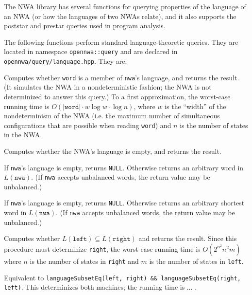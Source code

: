 The NWA library has several functions for querying
properties of the language of an NWA (or how the languages of two NWAs
relate), and it also supports
the poststar and prestar queries used in program analysis.

The following functions perform standard language-theoretic queries. They are
located in namespace \texttt{opennwa::query} and are declared in
\texttt{opennwa/query/language.hpp}. They are:
\begin{functionlist}
    Computes whether \texttt{word} is a member of
    \texttt{nwa}'s language, and returns the result. (It simulates the
    NWA in a nondeterministic fashion; the NWA is not determinized to answer
    this query.) To a first approximation, the worst-case running time is
    $O(|\texttt{word}|\cdot w\log w\cdot\log n)$, where $w$ is the ``width'' of
    the nondeterminism of the NWA (i.e. the maximum number of
    simultaneous configurations that are possible when reading \texttt{word})
    and $n$ is the number of states in the NWA.

    Computes
    whether the NWA's language is empty, and returns the result.

    If \texttt{nwa}'s language is empty, returns \texttt{NULL}. Otherwise
    returns an arbitrary word in $L(\texttt{nwa})$. (If \texttt{nwa} accepts
    unbalanced words, the return value may be unbalanced.)

    If \texttt{nwa}'s language is empty, returns \texttt{NULL}. Otherwise
    returns an arbitrary shortest word in $L(\texttt{nwa})$. (If \texttt{nwa} accepts
    unbalanced words, the return value may be unbalanced.)

    Computes whether $L(\texttt{left}) \subseteq L(\texttt{right})$
    and returns the result. Since this procedure must determinize \texttt{right},
    the worst-case running time is $O(2^{n^2}n^2m)$ where $n$ is the number of
    states in \texttt{right} and $m$ is the number of states in \texttt{left}.

    Equivalent to \texttt{languageSubsetEq(left, right) \&\&
    languageSubsetEq(right, left)}. This determinizes both machines; the
    running time is ... .
\end{functionlist}

